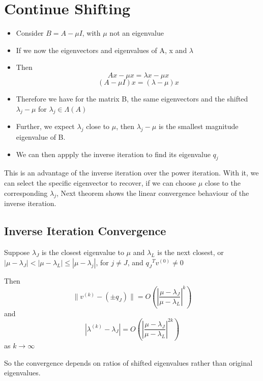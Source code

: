 \section{Continue Shifting}
\begin{itemize}
    \item Consider $B = A-\mu I$, with $\mu$ not an eigenvalue
    \item If we now the eigenvectors and eigenvalues of A, x and $\lambda$
    \item Then
        \[Ax - \mu x = \lambda x - \mu x \]   
        \[(A-\mu I)x = (\lambda-\mu)x\]
    \item Therefore we have for the matrix B, the same eigenvectors and the shifted $\lambda_j-\mu$ for $\lambda_j \in \Lambda(A)$
    \item Further, we expect $\lambda_j$ close to $\mu$, then $\lambda_j-\mu$ is the smallest magnitude eigenvalue of B.
    \item We can then appply the inverse iteration to find its eigenvalue $q_j$
 \end{itemize}
 This is an advantage of the inverse iteration over the power iteration. With it, we can select the specific eigenvector to recover, if we can choose $\mu$ close to the corresponding $\lambda_j$,
 Next theorem shows the linear convergence behaviour of the inverse iteration.
 \subsection{Inverse Iteration Convergence}
 \begin{theorem}
 \label{Inverse Iteration Convergence}
     Suppose $\lambda_J$ is the closest eigenvalue to $\mu$ and $\lambda_L$ is the next closest, or $|\mu-\lambda_J| < |\mu - \lambda_L| \leq |\mu - \lambda_j|$, for $j\neq J$, and ${q_J}^Tv^{(0)} \neq 0$

     Then \[\|v^{(k)} - (\pm q_J)\| = O{(|\frac{\mu - \lambda_J}{\mu - \lambda_L}|^{k})}\]
     and\[|\lambda^{(k)} -  \lambda_J| = O{(|\frac{\mu - \lambda_J}{\mu - \lambda_L}|^{2k})}\]
     as $k \rightarrow \infty$
 \end{theorem}
 So the convergence depends  on ratios of shifted eigenvalues rather than original eigenvalues.
